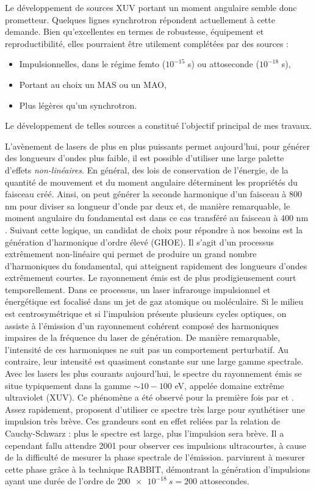 Le développement de sources XUV portant un moment angulaire semble donc prometteur. Quelques lignes synchrotron répondent actuellement à cette demande. Bien qu'excellentes en termes de robustesse, équipement et reproductibilité, elles pourraient être utilement complétées par des sources :
\begin{itemize}
\renewcommand{\labelitemi}{$\bullet$}
\setlength\itemsep{1em}
\item Impulsionnelles, dans le régime femto ($10^{-15}$ s) ou attoseconde ($10^{-18}$ s),
\item Portant au choix un MAS ou un MAO,
\item Plus légères qu'un synchrotron.
\end{itemize}
Le développement de telles sources a constitué l'objectif principal de mes travaux.

L'avènement de lasers de plus en plus puissants permet aujourd'hui, pour générer des longueurs d'ondes plus faible, il est possible d'utiliser une large palette d'effets \textit{non-linéaires}. En général, des lois de conservation de l'énergie, de la quantité de mouvement et du moment angulaire déterminent les propriétés du faisceau créé. Ainsi, on peut générer la seconde harmonique d'un faisceau à 800 nm pour diviser sa longueur d'onde par deux et, de manière remarquable, le moment angulaire du fondamental est dans ce cas transféré au faisceau à 400 nm . Suivant cette logique, un candidat de choix pour répondre à nos besoins est la génération d'harmonique d'ordre élevé (GHOE). Il s'agit d'un processus extrêmement non-linéaire qui permet de produire un grand nombre d'harmoniques du fondamental, qui atteignent rapidement des longueurs d'ondes extrêmement courtes. Le rayonnement émis est de plus prodigieusement court temporellement. Dans ce processus, un laser infrarouge impulsionnel et énergétique est focalisé dans un jet de gaz atomique ou moléculaire. Si le milieu est centrosymétrique et si l'impulsion présente plusieurs cycles optiques, on assiste à l'émission d'un rayonnement cohérent composé des harmoniques impaires de la fréquence du laser de génération. De manière remarquable, l'intensité de ces harmoniques ne suit pas un comportement perturbatif. Au contraire, leur intensité est quasiment constante sur une large gamme spectrale. Avec les lasers les plus courants aujourd'hui, le spectre du rayonnement émis se situe typiquement dans la gamme $\sim 10-100$ eV, appelée domaine extrême ultraviolet (XUV). Ce phénomène a été observé pour la première fois par  et . Assez rapidement,  proposent d'utiliser ce spectre très large pour synthétiser une impulsion très brève. Ces grandeurs sont en effet reliées par la relation de Cauchy-Schwarz : plus le spectre est large, plus l'impulsion sera brève. Il a cependant fallu attendre 2001 pour observer ces impulsions ultracourtes, à cause de la difficulté de mesurer la phase spectrale de l'émission.  parvinrent à mesurer cette phase grâce à la technique RABBIT, démontrant la génération d'impulsions ayant une durée de l'ordre de $\SI{200e-18}{s} = 200$ attosecondes. 

